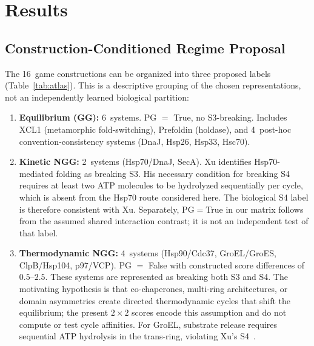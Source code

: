 \documentclass[12pt,a4paper]{article}
\begin{document}
\section{Results}

\subsection{Construction-Conditioned Regime Proposal}
\label{sec:regime_trinity}

The 16~game constructions can be organized into three proposed labels
(Table~\ref{tab:atlas}). This is a descriptive grouping of the chosen
representations, not an independently learned biological partition:

\begin{enumerate}
  \item \textbf{Equilibrium (GG):} 6~systems. PG $=$ True,
    no S3-breaking. Includes XCL1 (metamorphic fold-switching),
    Prefoldin (holdase), and 4~post-hoc convention-consistency systems
    (DnaJ, Hsp26, Hsp33, Hsc70).

  \item \textbf{Kinetic NGG:} 2~systems (Hsp70/DnaJ, SecA).
    Xu identifies Hsp70-mediated folding as breaking S3. His necessary
    condition for breaking S4 requires at least two ATP molecules to be
    hydrolyzed sequentially per cycle, which is absent from the Hsp70
    route considered here. The biological S4 label is therefore
    consistent with Xu. Separately, PG$=$True in our matrix follows
    from the assumed shared interaction contrast; it is not an
    independent test of that label.

  \item \textbf{Thermodynamic NGG:} 4~systems (Hsp90/Cdc37, GroEL/GroES,
    ClpB/Hsp104, p97/VCP). PG $=$ False with constructed score
    differences of $0.5$--$2.5$. These systems are represented as breaking both S3 and S4. The motivating
    hypothesis is that co-chaperones, multi-ring architectures, or domain
    asymmetries create directed thermodynamic cycles that shift the
    equilibrium; the present $2\times 2$ scores encode this assumption and
    do not compute or test cycle affinities. For GroEL, substrate release requires sequential ATP
    hydrolysis in the trans-ring, violating Xu's S4~\cite{Xu2022}.
\end{enumerate}
\end{document}
